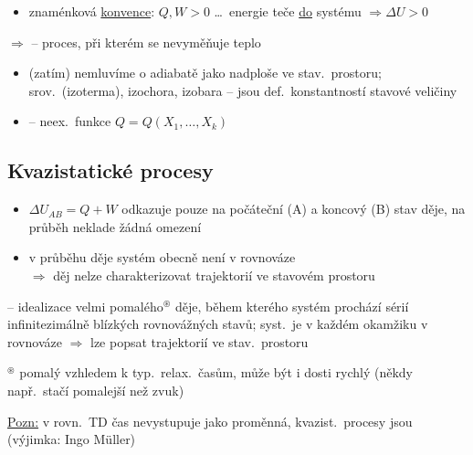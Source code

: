 \begin{itemize}
  \item znaménková \underline{konvence}: \quad $Q, W > 0$ \dots\ energie teče \underline{do} systému $\Rightarrow \Delta U > 0$
\end{itemize}

$\Rightarrow$  -- proces, při kterém se nevyměňuje teplo
\begin{itemize}
  \item[\pozor{!}] (zatím) nemluvíme o adiabatě jako nadploše ve stav.\ prostoru; srov.\ (izoterma), izochora, izobara -- jsou def.\ konstantností stavové veličiny
  \item {} -- neex.\ funkce $Q = Q(X_1,\dots,X_k)$
\end{itemize}

\subsection{Kvazistatické procesy}
\begin{itemize}
  \item $\Delta U_{AB} = Q + W$ odkazuje pouze na počáteční (A) a koncový (B) stav děje, na průběh neklade žádná omezení
  \item v průběhu děje systém obecně není v rovnováze \\
        $\Rightarrow$ děj nelze charakterizovat trajektorií ve stavovém prostoru
\end{itemize}

\providecommand{\dbar}{{\mathchar'26\mkern-12mu d}}
\begin{definice}
 -- idealizace velmi pomalého$^{\circledast}$ děje, během kterého systém prochází sérií infinitezimálně blízkých rovnovážných stavů; syst.\ je v každém okamžiku v rovnováze $\Rightarrow$ lze popsat trajektorií ve stav.\ prostoru

{\small $^{\circledast}$ pomalý vzhledem k typ.\ relax.\ časům, může být i dosti rychlý (někdy např.\ stačí pomalejší než zvuk)}
\end{definice}

\underline{Pozn:} v rovn.\ TD čas nevystupuje jako proměnná, kvazist.\ procesy jsou  (výjimka: Ingo Müller) \\

